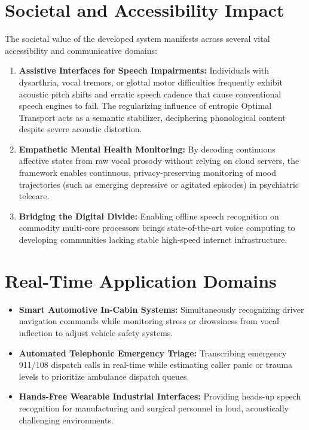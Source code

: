 \section{Societal and Accessibility Impact}
The societal value of the developed system manifests across several vital accessibility and communicative domains:
\begin{enumerate}
    \item \textbf{Assistive Interfaces for Speech Impairments:} Individuals with dysarthria, vocal tremors, or glottal motor difficulties frequently exhibit acoustic pitch shifts and erratic speech cadence that cause conventional speech engines to fail. The regularizing influence of entropic Optimal Transport acts as a semantic stabilizer, deciphering phonological content despite severe acoustic distortion.
    \item \textbf{Empathetic Mental Health Monitoring:} By decoding continuous affective states from raw vocal prosody without relying on cloud servers, the framework enables continuous, privacy-preserving monitoring of mood trajectories (such as emerging depressive or agitated episodes) in psychiatric telecare.
    \item \textbf{Bridging the Digital Divide:} Enabling offline speech recognition on commodity multi-core processors brings state-of-the-art voice computing to developing communities lacking stable high-speed internet infrastructure.
\end{enumerate}

\section{Real-Time Application Domains}
\begin{itemize}
    \item \textbf{Smart Automotive In-Cabin Systems:} Simultaneously recognizing driver navigation commands while monitoring stress or drowsiness from vocal inflection to adjust vehicle safety systems.
    \item \textbf{Automated Telephonic Emergency Triage:} Transcribing emergency 911/108 dispatch calls in real-time while estimating caller panic or trauma levels to prioritize ambulance dispatch queues.
    \item \textbf{Hands-Free Wearable Industrial Interfaces:} Providing heads-up speech recognition for manufacturing and surgical personnel in loud, acoustically challenging environments.
\end{itemize}
